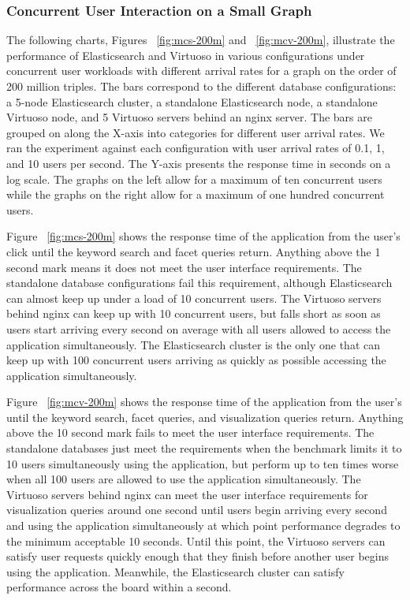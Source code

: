 \subsubsection{Concurrent User Interaction on a Small Graph} 
The following charts, Figures ~\ref{fig:mcs-200m} and ~\ref{fig:mcv-200m}, illustrate the performance of Elasticsearch and Virtuoso in various configurations under concurrent user workloads with different arrival rates for a graph on the order of 200 million triples.
The bars correspond to the different database configurations: a 5-node Elasticsearch cluster, a standalone Elasticsearch node, a standalone Virtuoso node, and 5 Virtuoso servers behind an nginx server.  
The bars are grouped on along the X-axis into categories for different user arrival rates.
We ran the experiment against each configuration with user arrival rates of 0.1, 1, and 10 users per second.
The Y-axis presents the response time in seconds on a log scale.  
The graphs on the left allow for a maximum of ten concurrent users while the graphs on the right allow for a maximum of one hundred concurrent users.  

Figure ~\ref{fig:mcs-200m} shows the response time of the application from the user's click until the keyword search and facet queries return.  Anything above the 1 second mark means it does not meet the user interface requirements.  
The standalone database configurations fail this requirement, although Elasticsearch can almost keep up under a load of 10 concurrent users.
The Virtuoso servers behind nginx can keep up with 10 concurrent users, but falls short as soon as users start arriving every second on average with all users allowed to access the application simultaneously.
The Elasticsearch cluster is the only one that can keep up with 100 concurrent users arriving as quickly as possible accessing the application simultaneously.

Figure ~\ref{fig:mcv-200m} shows the response time of the application from the user's until the keyword search, facet queries, and visualization queries return.  Anything above the 10 second mark fails to meet the user interface requirements.
The standalone databases just meet the requirements when the benchmark limits it to 10 users simultaneously using the application, but perform up to ten times worse when all 100 users are allowed to use the application simultaneously.
The Virtuoso servers behind nginx can meet the user interface requirements for visualization queries around one second until users begin arriving every second and using the application simultaneously at which point performance degrades to the minimum acceptable 10 seconds.
Until this point, the Virtuoso servers can satisfy user requests quickly enough that they finish before another user begins using the application. 
Meanwhile, the Elasticsearch cluster can satisfy performance across the board within a second.  

